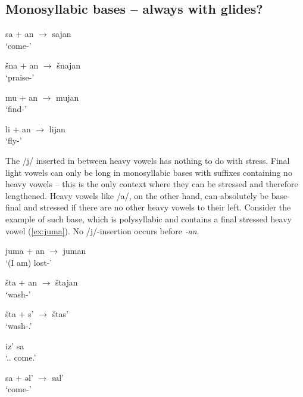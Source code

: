 \documentclass[a4paper, 12pt]{article}
\begin{document}
			\subsection{Monosyllabic bases -- always with glides?}
		
\begin{minipage}[t]{.45\linewidth}
\ex\label{ex:sa1}
	sa + an $\rightarrow$ sajan \\`come-{\Fsg}' \\ \parencite[p. 57]{kozlov2018}
\xe
\end{minipage}
\hfill
\begin{minipage}[t]{.45\linewidth}
\ex\label{ex:shna1}
	šna + an $\rightarrow$ šnajan \\`praise-{\Fsg}' 
\xe
\end{minipage}	

\begin{minipage}[t]{.45\linewidth}
\ex\label{ex:mu1}
	mu + an $\rightarrow$ mujan \\`find-{\Fsg}' 
\xe
\end{minipage}
\hfill
\begin{minipage}[t]{.45\linewidth}
\ex\label{ex:li1}
	li + an $\rightarrow$ lijan \\`fly-{\Fsg}' 
\xe
\end{minipage}	
	
	The /j/ inserted in between heavy vowels has nothing to do with stress. Final light vowels can only be long in monosyllabic bases with suffixes containing no heavy vowels -- this is the only context where they can be stressed and therefore lengthened. Heavy vowels like /a/, on the other hand, can absolutely be base-final and stressed if there are no other heavy vowels to their left. Consider the example of such base, which is polysyllabic and contains a final stressed heavy vowel (\ref{ex:juma}). No /j/-insertion occurs before \emph{-an}.
	
\begin{minipage}[t]{.45\linewidth}
\ex\label{ex:juma}
	juma + an $\rightarrow$ juman \\`(I am) lost-{\Fsg}' 
\xe
\end{minipage}
\hfill
\begin{minipage}[t]{.45\linewidth}
\ex\label{ex:shtajan}
	šta + an $\rightarrow$ štajan \\`wash-{\Fsg}' 
\xe
\end{minipage}	

\begin{minipage}[t]{.3\linewidth}
\ex\label{ex:shtas}
	šta + s' $\rightarrow$ štas' \\`wash-{\Pst}.{\Tsg}' 
\xe
\end{minipage}
\hfill
\begin{minipage}[t]{.34\linewidth}
\ex\label{ex:izsa}
	iz' sa \\`{\Neg}.{\Pst}.{\Tsg} come.{\Cn}'
\xe
\end{minipage}	
\hfill
\begin{minipage}[t]{.3\linewidth}
\ex\label{ex:sal}
	sa + əl' $\rightarrow$ sal' \\`come-{\Ipf}'
\xe
\end{minipage}	
\end{document}
